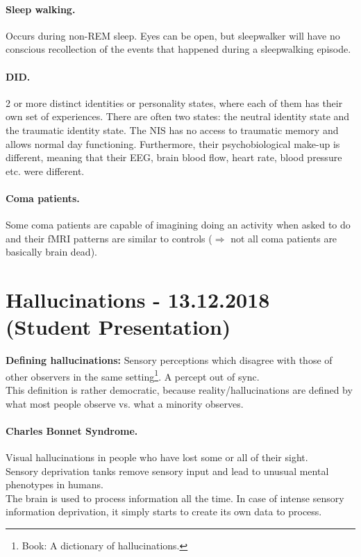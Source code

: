 \documentclass{article}
\begin{document}
	\paragraph{Sleep walking.}Occurs during non-REM sleep. Eyes can be open, but sleepwalker will have no conscious recollection of the events that happened during a sleepwalking episode.
	
	\paragraph{DID.}2 or more distinct identities or personality states, where each of them has their own set of experiences. There are often two states: the neutral identity state and the traumatic identity state. The NIS has no access to traumatic memory and allows normal day functioning. Furthermore, their psychobiological make-up is different, meaning that their EEG, brain blood flow, heart rate, blood pressure etc. were different.
	
	\paragraph{Coma patients.}Some coma patients are capable of imagining doing an activity when asked to do and their fMRI patterns are similar to controls ($\Rightarrow$ not all coma patients are basically brain dead).
	
	\section{Hallucinations - 13.12.2018 (Student Presentation)}
	\textbf{Defining hallucinations:} Sensory perceptions which disagree with those of other observers in the same setting\footnote{Book: A dictionary of hallucinations.}. A percept out of sync.\\
	This definition is rather democratic, because reality/hallucinations are defined by what most people observe vs. what a minority observes.\newline
	
	\paragraph{Charles Bonnet Syndrome.}Visual hallucinations in people who have lost some or all of their sight.\\
	Sensory deprivation tanks remove sensory input and lead to unusual mental phenotypes in humans.\\
	The brain is used to process information all the time. In case of intense sensory information deprivation, it simply starts to create its own data to process.\newline
	
\end{document}
